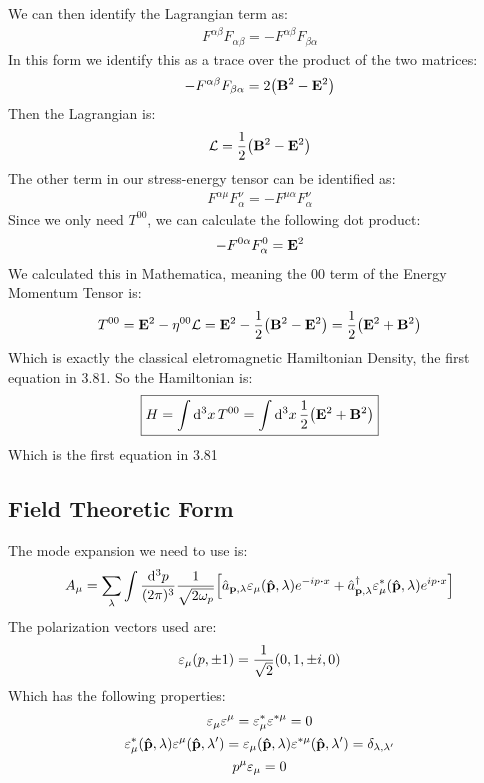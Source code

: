 \documentclass[12pt]{article}
\renewcommand{\L}{\mathcal{L}}
\newcommand{\veps}{\varepsilon}
\begin{document}
We can then identify the Lagrangian term as:
\begin{align*}
  F^{\alpha\beta}F_{\alpha\beta}=-F^{\alpha\beta}F_{\beta\alpha}
\end{align*}
In this form we identify this as a trace over the product of the two matrices:
\begin{align*}
  -F^{\alpha\beta}F_{\beta\alpha}=2\qty(\vb{B}^2-\vb{E}^2)
\end{align*}
Then the Lagrangian is:
\begin{align*}
  \L=\frac12\qty(\vb{B}^2-\vb{E}^2)
\end{align*}
The other term in our stress-energy tensor can be identified as:
\begin{align*}
  F^{\alpha\mu}F^\nu_\alpha=-F^{\mu\alpha}F^\nu_\alpha
\end{align*}
Since we only need $T^{00}$, we can calculate the following dot product:
\begin{align*}
  -F^{0\alpha}F^0_\alpha=\vb{E}^2
\end{align*}
We calculated this in Mathematica, meaning the $00$ term of the Energy Momentum Tensor is:
\begin{align*}
  T^{00}=\vb{E}^2-\eta^{00}\L=\vb{E}^2-\frac12\qty(\vb{B}^2-\vb{E}^2)=
  \frac12\qty(\vb{E}^2+\vb{B}^2)
\end{align*}
Which is exactly the classical eletromagnetic Hamiltonian Density, the first equation in 3.81. So the Hamiltonian is:
\begin{align*}
  \boxed{H=\int\dd[3]{x}T^{00}=\int\dd[3]{x}\frac12\qty(\vb{E}^2+\vb{B}^2)}
\end{align*}
Which is the first equation in 3.81

\subsection{Field Theoretic Form}
The mode expansion we need to use is:
\begin{align*}
  A_\mu=\sum_\lambda\int\frac{\dd[3]{p}}{(2\pi)^3}\frac1{\sqrt{2\omega_p}}
  \qty[
  \hat{a}_{\vb{p},\lambda}\veps_\mu(\vu{p},\lambda)e^{-ip\vdot x}+
  \hat{a}^\dag_{\vb{p},\lambda}\veps^*_\mu(\vu{p},\lambda)e^{ip\vdot x}]
\end{align*}
The polarization vectors used are:
\begin{align*}
  \veps_\mu(p,\pm1)=\frac1{\sqrt{2}}\qty(0,1,\pm i,0)
\end{align*}
Which has the following properties:
\begin{gather*}
  \veps_\mu\veps^\mu=\veps^*_\mu\veps^{*\mu}=0\\
  \veps^*_\mu(\vu{p},\lambda)\veps^\mu(\vu{p},\lambda')
  =\veps_\mu(\vu{p},\lambda)\veps^{*\mu}(\vu{p},\lambda')=
  \delta_{\lambda,\lambda'}\\
  p^\mu\veps_\mu=0
\end{gather*}
\end{document}
